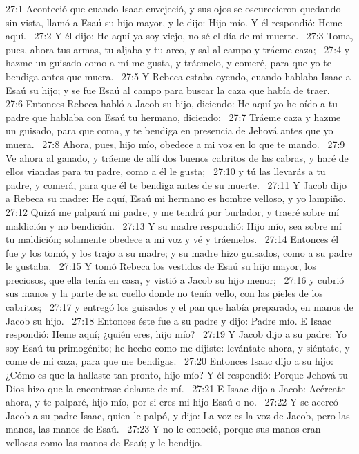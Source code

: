 27:1 Aconteció que cuando Isaac envejeció, y sus ojos se oscurecieron quedando sin vista, llamó a Esaú su hijo mayor, y le dijo: Hijo mío. Y él respondió: Heme aquí.  
27:2 Y él dijo: He aquí ya soy viejo, no sé el día de mi muerte.  
27:3 Toma, pues, ahora tus armas, tu aljaba y tu arco, y sal al campo y tráeme caza;  
27:4 y hazme un guisado como a mí me gusta, y tráemelo, y comeré, para que yo te bendiga antes que muera.  
27:5 Y Rebeca estaba oyendo, cuando hablaba Isaac a Esaú su hijo; y se fue Esaú al campo para buscar la caza que había de traer.  
27:6 Entonces Rebeca habló a Jacob su hijo, diciendo: He aquí yo he oído a tu padre que hablaba con Esaú tu hermano, diciendo:  
27:7 Tráeme caza y hazme un guisado, para que coma, y te bendiga en presencia de Jehová antes que yo muera.  
27:8 Ahora, pues, hijo mío, obedece a mi voz en lo que te mando.  
27:9 Ve ahora al ganado, y tráeme de allí dos buenos cabritos de las cabras, y haré de ellos viandas para tu padre, como a él le gusta;  
27:10 y tú las llevarás a tu padre, y comerá, para que él te bendiga antes de su muerte.  
27:11 Y Jacob dijo a Rebeca su madre: He aquí, Esaú mi hermano es hombre velloso, y yo lampiño.  
27:12 Quizá me palpará mi padre, y me tendrá por burlador, y traeré sobre mí maldición y no bendición.  
27:13 Y su madre respondió: Hijo mío, sea sobre mí tu maldición; solamente obedece a mi voz y vé y tráemelos.  
27:14 Entonces él fue y los tomó, y los trajo a su madre; y su madre hizo guisados, como a su padre le gustaba.  
27:15 Y tomó Rebeca los vestidos de Esaú su hijo mayor, los preciosos, que ella tenía en casa, y vistió a Jacob su hijo menor;  
27:16 y cubrió sus manos y la parte de su cuello donde no tenía vello, con las pieles de los cabritos;  
27:17 y entregó los guisados y el pan que había preparado, en manos de Jacob su hijo.  
27:18 Entonces éste fue a su padre y dijo: Padre mío. E Isaac respondió: Heme aquí; ¿quién eres, hijo mío?  
27:19 Y Jacob dijo a su padre: Yo soy Esaú tu primogénito; he hecho como me dijiste: levántate ahora, y siéntate, y come de mi caza, para que me bendigas.  
27:20 Entonces Isaac dijo a su hijo: ¿Cómo es que la hallaste tan pronto, hijo mío? Y él respondió: Porque Jehová tu Dios hizo que la encontrase delante de mí.  
27:21 E Isaac dijo a Jacob: Acércate ahora, y te palparé, hijo mío, por si eres mi hijo Esaú o no.  
27:22 Y se acercó Jacob a su padre Isaac, quien le palpó, y dijo: La voz es la voz de Jacob, pero las manos, las manos de Esaú.  
27:23 Y no le conoció, porque sus manos eran vellosas como las manos de Esaú; y le bendijo.  
